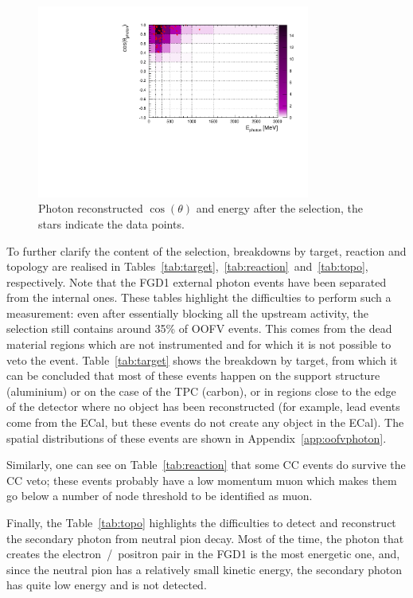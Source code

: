 \begin{figure}[ht]
  \center
  \includegraphics[width=0.8\textwidth]{images/NCg/gamma2D.pdf}
  \caption[Photon reconstructed $\cos(\theta)$ and energy after the
  selection]{Photon reconstructed $\cos(\theta)$ and energy after the
    selection, the stars indicate the data points.}
  \label{fig:finalsample2d}
\end{figure}


To further clarify the content of the selection, breakdowns by target,
reaction and topology are realised in
Tables~\ref{tab:target},~\ref{tab:reaction}~and~\ref{tab:topo},
respectively. Note that the \Gls{FGD}1 external photon events have
been separated from the internal ones. These tables highlight the
difficulties to perform such a measurement: even after essentially
blocking all the upstream activity, the selection still contains
around 35\% of \Gls{OOFV} events. This comes from the dead material
regions which are not instrumented and for which it is not possible to
veto the event. Table~\ref{tab:target} shows the breakdown by target,
from which it can be concluded that most of these events happen on the
support structure (aluminium) or on the case of the \Gls{TPC}
(carbon), or in regions close to the edge of the detector where no
object has been reconstructed (for example, lead events come from the
\Gls{ECal}, but these events do not create any object in the
\Gls{ECal}). The spatial distributions of these events are shown in
Appendix~\ref{app:oofvphoton}.

Similarly, one can see on Table~\ref{tab:reaction} that some \Gls{CC}
events do survive the \Gls{CC} veto; these events probably have a low
momentum muon which makes them go below a number of node threshold to
be identified as muon.

Finally, the Table~\ref{tab:topo} highlights the difficulties to
detect and reconstruct the secondary photon from neutral pion
decay. Most of the time, the photon that creates the
electron~/~positron pair in the \Gls{FGD}1 is the most energetic one,
and, since the neutral pion has a relatively small kinetic energy, the
secondary photon has quite low energy and is not detected.



